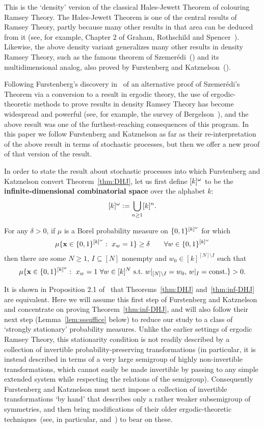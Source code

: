 \documentclass[11pt]{article}
\begin{document}
This is the `density' version of the classical Hales-Jewett Theorem
of colouring Ramsey Theory.  The Hales-Jewett Theorem is one of the
central results of Ramsey Theory, partly because many other results
in that area can be deduced from it (see, for example, Chapter 2 of
Graham, Rothschild and Spencer~\cite{GraRotSpe90}).  Likewise, the
above density variant generalizes many other results in density
Ramsey Theory, such as the famous theorem of
Szemer\'edi~(\cite{Sze75}) and its multidimensional analog, also
proved by Furstenberg and Katznelson~(\cite{FurKat78}).

Following Furstenberg's discovery in~\cite{Fur77} of an alternative
proof of Szemer\'edi's Theorem via a conversion to a result in
ergodic theory, the use of ergodic-theoretic methods to prove
results in density Ramsey Theory has become widespread and powerful
(see, for example, the survey of Bergelson~\cite{Ber96}), and the
above result was one of the furthest-reaching consequences of this
program. In this paper we follow Furstenberg and Katznelson as far
as their re-interpretation of the above result in terms of
stochastic processes, but then we offer a new proof of that version
of the result.

In order to state the result about stochastic processes into which
Furstenberg and Katznelson convert Theorem~\ref{thm:DHJ}, let us
first define $[k]^\omega$ to be the \textbf{infinite-dimensional
combinatorial space} over the alphabet $k$:
\[[k]^\omega := \bigcup_{n\geq 1}[k]^n.\]

\begin{thm}\label{thm:inf-DHJ}
For any $\delta > 0$, if $\mu$ is a Borel probability measure on
$\{0,1\}^{[k]^\omega}$ for which
\[\mu\{\mathbf{x} \in \{0,1\}^{[k]^\omega}:\ x_w = 1\} \geq \delta\quad\quad\forall w \in \{0,1\}^{[k]^\omega}\]
then there are some $N\geq 1$, $I\subseteq [N]$ nonempty and $w_0
\in [k]^{[N]\setminus I}$ such that
\[\mu\{\bf{x} \in \{0,1\}^{[k]^\o}:\ x_w = 1\ \forall w \in [k]^N\ \rm{s.t.}\ w|_{[N]\setminus I} = w_0,\,w|_I = \rm{const.}\} > 0.\]
\end{thm}

It is shown in Proposition 2.1 of~\cite{FurKat91} that
Theorems~\ref{thm:DHJ} and~\ref{thm:inf-DHJ} are equivalent.  Here
we will assume this first step of Furstenberg and Katznelson and
concentrate on proving Theorem~\ref{thm:inf-DHJ}, and will also
follow their next step (Lemma~\ref{lem:sssuffice} below) to reduce
our study to a class of `strongly stationary' probability measures.
Unlike the earlier settings of ergodic Ramsey Theory, this
stationarity condition is not readily described by a collection of
invertible probability-preserving transformations (in particular, it
is instead described in terms of a very large semigroup of highly
non-invertible transformations, which cannot easily be made
invertible by passing to any simple extended system while respecting
the relations of the semigroup). Consequently Furstenberg and
Katznelson must next impose a collection of invertible
transformations `by hand' that describes only a rather weaker
subsemigroup of symmetries, and then bring modifications of their
older ergodic-theoretic techniques~(see, in particular, \cite{Fur81}
and~\cite{FurKat85}) to bear on these.
\end{document}
